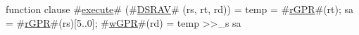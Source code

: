 function clause #\hyperref[zexecute]{execute}# (#\hyperref[zDSRAV]{DSRAV}# (rs, rt, rd)) =
  {
    temp     = #\hyperref[zrGPR]{rGPR}#(rt);
    sa = #\hyperref[zrGPR]{rGPR}#(rs)[5..0];
    #\hyperref[zwGPR]{wGPR}#(rd) = temp >>_s sa
  }
